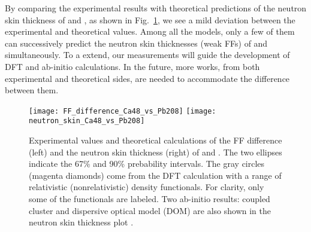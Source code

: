 By comparing the experimental results with theoretical predictions of the neutron
skin thickness of \Pb and \Ca, as shown in Fig.~\ref{fig:pcrex_R_skin}, we see
a mild deviation between the experimental and theoretical values. Among all
the models, only a few of them can successively predict the 
neutron skin thicknesses (weak FFs) of \Pb and \Ca simultaneously. 
To a extend, our measurements will guide the development of DFT and ab-initio 
calculations. In the future, more works, from both experimental and theoretical sides, 
are needed to accommodate the difference between them. 

\begin{figure}[!h]
    \centering
    \texttt{[image: FF\_difference\_Ca48\_vs\_Pb208]}
    \texttt{[image: neutron\_skin\_Ca48\_vs\_Pb208]}
    \caption[FF and Rskin difference]
    {Experimental values and theoretical calculations of the FF difference (left)
    and the neutron skin thickness (right) of \Pb and \Ca. The two ellipses indicate
    the 67\% and 90\% prebability intervals. The gray circles (magenta diamonds) come
    from the DFT calculation with a range of relativistic (nonrelativistic) density functionals. 
    For clarity, only some of the functionals are labeled. Two ab-initio results:
    coupled cluster and dispersive optical model (DOM) are also shown in the 
    neutron skin thickness plot \cite{PhysRevLett.129.042501}.
    }
    \label{fig:pcrex_R_skin}
\end{figure}




